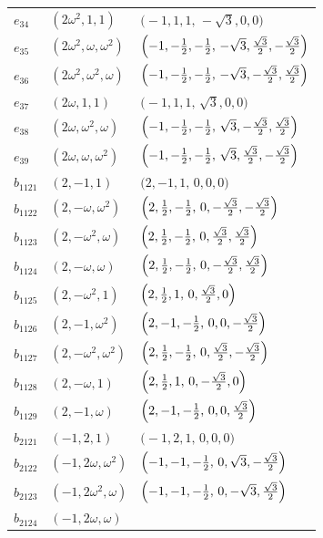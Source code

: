 \documentclass[%
  reprint,
  superscriptaddress,
  amsmath,amssymb,
  pra,
  floatfix,
  longbibliography
]{revtex4-2}
\begin{document}
\begin{longtable}{lll}
$e_{34}$ & $(2\omega^2,1,1)$ &
$\bigl(-1,1,1,\,-\sqrt{3},0,0\bigr)$ \\
$e_{35}$ & $(2\omega^2,\omega,\omega^2)$ &
$\Bigl(-1,-\tfrac12,-\tfrac12,\,-\sqrt{3},\tfrac{\sqrt{3}}{2},-\tfrac{\sqrt{3}}{2}\Bigr)$ \\
$e_{36}$ & $(2\omega^2,\omega^2,\omega)$ &
$\Bigl(-1,-\tfrac12,-\tfrac12,\,-\sqrt{3},-\tfrac{\sqrt{3}}{2},\tfrac{\sqrt{3}}{2}\Bigr)$ \\
$e_{37}$ & $(2\omega,1,1)$ &
$\bigl(-1,1,1,\,\sqrt{3},0,0\bigr)$ \\
$e_{38}$ & $(2\omega,\omega^2,\omega)$ &
$\Bigl(-1,-\tfrac12,-\tfrac12,\,\sqrt{3},-\tfrac{\sqrt{3}}{2},\tfrac{\sqrt{3}}{2}\Bigr)$ \\
$e_{39}$ & $(2\omega,\omega,\omega^2)$ &
$\Bigl(-1,-\tfrac12,-\tfrac12,\,\sqrt{3},\tfrac{\sqrt{3}}{2},-\tfrac{\sqrt{3}}{2}\Bigr)$ \\
$b_{1121}$ & $(2,-1,1)$ &
$\bigl(2,-1,1,\,0,0,0\bigr)$ \\
$b_{1122}$ & $(2,-\omega,\omega^2)$ &
$\Bigl(2,\tfrac12,-\tfrac12,\,0,-\tfrac{\sqrt{3}}{2},-\tfrac{\sqrt{3}}{2}\Bigr)$ \\
$b_{1123}$ & $(2,-\omega^2,\omega)$ &
$\Bigl(2,\tfrac12,-\tfrac12,\,0,\tfrac{\sqrt{3}}{2},\tfrac{\sqrt{3}}{2}\Bigr)$ \\
$b_{1124}$ & $(2,-\omega,\omega)$ &
$\Bigl(2,\tfrac12,-\tfrac12,\,0,-\tfrac{\sqrt{3}}{2},\tfrac{\sqrt{3}}{2}\Bigr)$ \\
$b_{1125}$ & $(2,-\omega^2,1)$ &
$\Bigl(2,\tfrac12,1,\,0,\tfrac{\sqrt{3}}{2},0\Bigr)$ \\
$b_{1126}$ & $(2,-1,\omega^2)$ &
$\Bigl(2,-1,-\tfrac12,\,0,0,-\tfrac{\sqrt{3}}{2}\Bigr)$ \\
$b_{1127}$ & $(2,-\omega^2,\omega^2)$ &
$\Bigl(2,\tfrac12,-\tfrac12,\,0,\tfrac{\sqrt{3}}{2},-\tfrac{\sqrt{3}}{2}\Bigr)$ \\
$b_{1128}$ & $(2,-\omega,1)$ &
$\Bigl(2,\tfrac12,1,\,0,-\tfrac{\sqrt{3}}{2},0\Bigr)$ \\
$b_{1129}$ & $(2,-1,\omega)$ &
$\Bigl(2,-1,-\tfrac12,\,0,0,\tfrac{\sqrt{3}}{2}\Bigr)$ \\
$b_{2121}$ & $(-1,2,1)$ &
$\bigl(-1,2,1,\,0,0,0\bigr)$ \\
$b_{2122}$ & $(-1,2\omega,\omega^2)$ &
$\Bigl(-1,-1,-\tfrac12,\,0,\sqrt{3},-\tfrac{\sqrt{3}}{2}\Bigr)$ \\
$b_{2123}$ & $(-1,2\omega^2,\omega)$ &
$\Bigl(-1,-1,-\tfrac12,\,0,-\sqrt{3},\tfrac{\sqrt{3}}{2}\Bigr)$ \\
$b_{2124}$ & $(-1,2\omega,\omega)$ &

\end{longtable}
\end{document}
